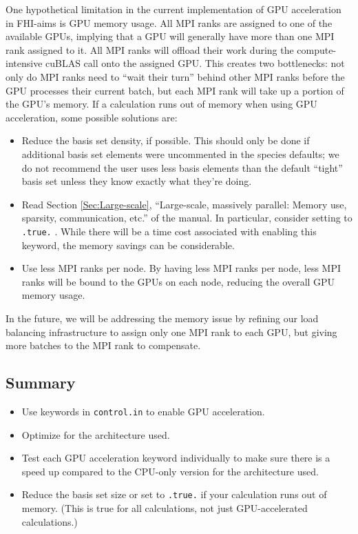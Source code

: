 One hypothetical limitation in the current implementation of GPU acceleration in FHI-aims is GPU memory usage.  All MPI ranks are assigned to one of the available GPUs, implying that a GPU will generally have more than one MPI rank assigned to it.  All MPI ranks will offload their work during the compute-intensive cuBLAS call onto the assigned GPU.  This creates two bottlenecks:  not only do MPI ranks need to ``wait their turn'' behind other MPI ranks before the GPU processes their current batch, but each MPI rank will take up a portion of the GPU's memory.  If a calculation runs out of memory when using GPU acceleration, some possible solutions are:
\begin{itemize}
	\item Reduce the basis set density, if possible.  This should only be done if additional basis set elements were uncommented in the species defaults; we do not recommend the user uses less basis elements than the default ``tight'' basis set unless they know exactly what they're doing.
	\item Read Section \ref{Sec:Large-scale}, ``Large-scale, massively parallel: Memory use, sparsity, communication, etc.'' of the manual.  In particular, consider setting  to \texttt{.true.} .  While there will be a time cost associated with enabling this keyword,  the memory savings can be considerable.
	\item Use less MPI ranks per node.  By having less MPI ranks per node, less MPI ranks will be bound to the GPUs on each node, reducing the overall GPU memory usage.
\end{itemize}
In the future, we will be addressing the memory issue by refining our load balancing infrastructure to assign only one MPI rank to each GPU, but giving more batches to the MPI rank to compensate.

\subsection*{Summary}
\begin{itemize}
	\item Use keywords in \texttt{control.in} to enable GPU acceleration.
	\item Optimize  for the architecture used.
	\item Test each GPU acceleration keyword individually to make sure there is a speed up compared to the CPU-only version for the architecture used. 
	\item Reduce the basis set size or set  to \texttt{.true.} if your calculation runs out of memory.  (This is true for all calculations, not just GPU-accelerated calculations.)
\end{itemize}

